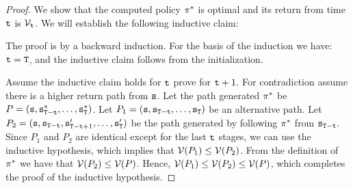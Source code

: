 \begin{proof}
We show that the computed policy $\pi^*$ is optimal and its
return from time ${\tt t}$ is $\mathcal{V}_{{\tt t}}$. We will establish
the following inductive claim:

\smallskip
{}

\smallskip
The proof is by a backward induction. For the basis of the induction
we have: ${\tt t}={\tt T}$, and the inductive claim follows from
the initialization.


Assume the inductive claim holds for ${\tt t}$ prove for ${\tt t}+1$.
For contradiction assume there is a higher return path from
${\tt s}$. Let the path generated $\pi^*$ be
$P=({\tt s},{\tt s}^*_{{\tt T}-{\tt t}},\ldots,{\tt s}^*_{\tt T})$.
Let $P_1=({\tt s},{\tt s}_{{\tt T}-{\tt t}},\ldots,{\tt s}_{\tt T}
)$ be an alternative path. Let
$P_2=({\tt s},{\tt s}_{{\tt T}-{\tt t}},{\tt s}'_{{\tt T}-{\tt t}+1},
\ldots,{\tt s}'_{\tt T} )$ be the path generated by following
$\pi^*$ from ${\tt s}_{{\tt T}-{\tt t}}$. Since $P_1$ and $P_2$
are identical except for the last ${\tt t}$ stages, we can use the
inductive hypothesis, which implies that $\mathcal{V}(P_1)\leq
\mathcal{V}(P_2)$. From the definition of $\pi^*$ we have that
$\mathcal{V}(P_2)\leq \mathcal{V}(P)$. Hence, $\mathcal{V}(P_1)\leq \mathcal{V}(P_2)\leq
\mathcal{V}(P)$, which completes the proof of the inductive hypothesis.
%
\end{proof}

